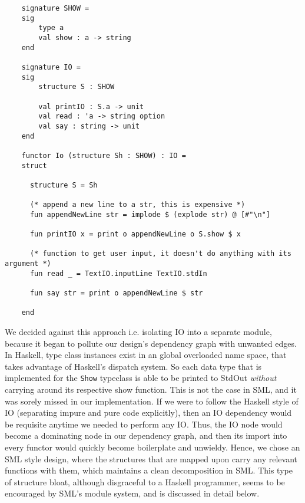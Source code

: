 \documentclass[9pt,letterpaper]{extarticle}
\begin{document}
  \begin{verbatim}
    signature SHOW =
    sig
        type a
        val show : a -> string
    end
    
    signature IO =
    sig
        structure S : SHOW
    
        val printIO : S.a -> unit
        val read : 'a -> string option
        val say : string -> unit
    end
    
    functor Io (structure Sh : SHOW) : IO =
    struct
    
      structure S = Sh
    
      (* append a new line to a str, this is expensive *)
      fun appendNewLine str = implode $ (explode str) @ [#"\n"]
    
      fun printIO x = print o appendNewLine o S.show $ x
    
      (* function to get user input, it doesn't do anything with its argument *)
      fun read _ = TextIO.inputLine TextIO.stdIn
    
      fun say str = print o appendNewLine $ str
    
    end
  \end{verbatim}
  We decided against this approach i.e. isolating IO into a separate module,
  because it began to pollute our design's dependency graph with unwanted edges.
  In Haskell, type class instances exist in an global overloaded name space,
  that takes advantage of Haskell's dispatch system. So each data type that is
  implemented for the \texttt{Show} typeclass is able to be printed to StdOut
  \textit{without} carrying around its respective show function. This is not the
  case in SML, and it was sorely missed in our implementation. If we were to
  follow the Haskell style of IO (separating impure and pure code explicitly),
  then an IO dependency would be requisite anytime we needed to perform any IO.
  Thus, the IO node would become a dominating node in our dependency graph, and
  then its import into every functor would quickly become boilerplate and
  unwieldy. Hence, we chose an SML style design, where the structures that are
  mapped upon carry any relevant functions with them, which maintains a clean
  decomposition in SML. This type of structure bloat, although disgraceful to a
  Haskell programmer, seems to be encouraged by SML's module system, and is
  discussed in detail below.
\end{document}
